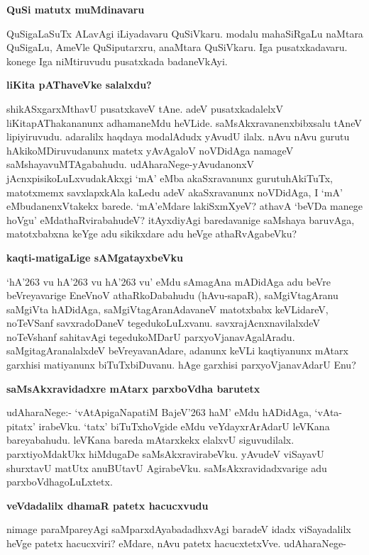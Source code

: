 {\medskip
\noindent
{\large\bf QuSi matutx muMdinavaru}}\label{page123}
\medskip

\noindent
QuSigaLaSuTx ALavAgi iLiyadavaru QuSiVkaru. modalu mahaSiRgaLu naMtara QuSigaLu, AmeVle QuSiputarxru, anaMtara QuSiVkaru. Iga pusatxkadavaru. konege Iga niMtiruvudu pusatxkada badaneVkAyi.

{\medskip
\noindent
{\large\bf liKita pAThaveVke salalxdu?}}\label{page123}
\medskip

\noindent
shikASxgarxMthavU pusatxkaveV tAne. adeV pusatxkadalelxV liKitapAThakananunx adhamaneMdu heVLide. saMsAkxrava\-nenxbibxsalu tAneV lipiyiruvudu. adaralilx haqdaya modalAdudx yAvudU ilalx. nAvu nAvu gurutu hAkikoMDiruvudanunx matetx yAvAgaloV noVDidAga namageV saMshayavuMTAgabahudu. udA\-hara\-Nege-yAvudanonxV jAcnxpisikoLuLxvudakAkxgi `mA' eMba akaSxravanunx gurutuhAkiTuTx, matotxmemx savxlapx\-kAla kaLedu adeV akaSxravanunx noVDidAga, I `mA' eMbudanenxVtakekx barede. `mA'\break eMdare lakiSxmXyeV?\- athavA `beVDa manege hoVgu'  eMdathaRvirabahudeV? itAyxdi\-yAgi baredavanige saMshaya baru\-vAga, matotx\-babxna keYge adu sikikxdare adu heVge athaRvAgabeVku?

{\bigskip
\noindent
{\large\bf kaqti-matigaLige sAMgatayxbeVku}}\label{page123}
\medskip

\noindent
`hA\char'263 vu hA\char'263 vu hA\char'263 vu' eMdu sAmagAna mADidAga adu beVre beVreyavarige EneVnoV athaR\-koDa\-bahudu (hAvu-sapaR), saMgiVtagAranu saMgiVta hADidAga, saMgiVtagAranAdavaneV matotxbabx keVLi\-dareV, noTeVSanf savxradoDaneV tegedukoLuLx\-vanu. savxrajAcnxnavilalxdeV noTeVshanf sahitavAgi tegedu\-koMDarU parxyoVjana\-vAga\-lAradu. saMgitagAranalalxdeV beVreyavanAdare, adanunx keVLi kaqtiyanunx mAtarx \hbox{garxhisi} matiyanunx biTuTxbiDuvanu. hAge \hbox{garxhisi} parxyoVjanavAdarU Enu?

{\bigskip
\noindent
{\large\bf saMsAkxravidadxre mAtarx parxboVdha barutetx}}\label{page124}
\medskip

\noindent
udAharaNege:- `vAtApigaNapatiM BajeV\char'263 haM'\label{124} eMdu hADidAga, `vAta-pitatx' irabeVku. `tatx' biTuTx\-hoVgide eMdu veYdayxrArAdarU leVKana bareyabahudu. leVKana bareda mAtarxkekx elalxvU siguvudilalx. parxtiyoMdakUkx hiMdugaDe saMsAkxravirabeVku. yAvudeV viSayavU shurxtavU matUtx anuBUtavU AgirabeVku. saMsAkxravidadxvarige adu parxboVdhagoLuLxtetx.

{\bigskip
\noindent
{\large\bf veVdadalilx dhamaR patetx hacucxvudu}}\label{page124}
\medskip

\noindent
nimage paraMpareyAgi saMparxdAyabadadhxvAgi baradeV idadx viSayadalilx heVge patetx hacucxviri? eMda\-re, nAvu patetx hacucxtetxVve. udAharaNege-

